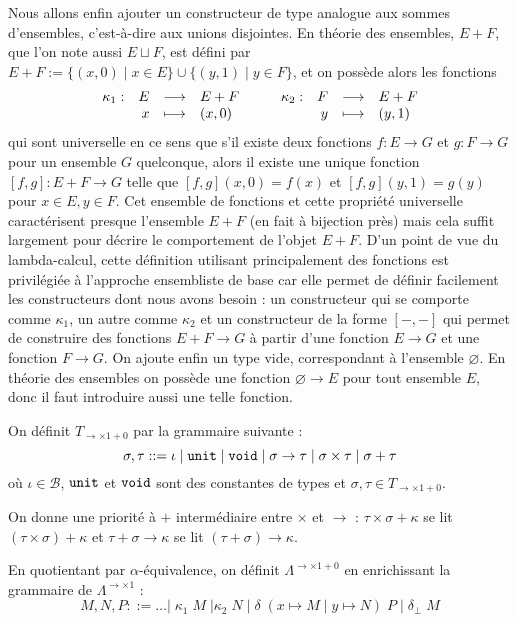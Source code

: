 Nous allons enfin ajouter un constructeur de type analogue aux sommes d'ensembles, c'est-à-dire aux unions disjointes. En théorie des ensembles, $E + F$, que l'on note aussi $E\sqcup F$, est défini par $E + F := \{(x,0)\mid x\in E\}\cup \{(y,1)\mid y\in F\}$, et on possède alors les fonctions $$\begin{array}[t]{lrcl} \kappa_1: & E & \longrightarrow & E+F \\ & x & \longmapsto & (x,0) \end{array}\qquad\begin{array}[t]{lrcl} \kappa_2: & F & \longrightarrow & E+F \\ & y & \longmapsto & (y,1) \end{array}$$ qui sont universelle en ce sens que s'il existe deux fonctions $f : E \to G$ et $g : F\to G$ pour un ensemble $G$ quelconque, alors il existe une unique fonction $[f,g] : E+F\to G$ telle que $[f,g](x,0) = f(x)$ et $[f,g](y,1) = g(y)$ pour $x\in E, y\in F$. Cet ensemble de fonctions et cette propriété universelle caractérisent presque l'ensemble $E+F$ (en fait à bijection près) mais cela suffit largement pour décrire le comportement de l'objet $E+F$. D'un point de vue du lambda-calcul, cette définition utilisant principalement des fonctions est privilégiée à l'approche ensembliste de base car elle permet de définir facilement les constructeurs dont nous avons besoin : un constructeur qui se comporte comme $\kappa_1$, un autre comme $\kappa_2$ et un constructeur de la forme $[-,-]$ qui permet de construire des fonctions $E+F\to G$ à partir d'une fonction $E\to G$ et une fonction $F\to G$. On ajoute enfin un type vide, correspondant à l'ensemble $\varnothing$. En théorie des ensembles on possède une fonction $\varnothing \to E$ pour tout ensemble $E$, donc il faut introduire aussi une telle fonction.

\begin{defi}
    On définit $T_{\to\times 1+0}$ par la grammaire suivante : $$\sigma,\tau ::= \iota\mid\texttt{unit}\mid\texttt{void}\mid \sigma\to\tau\mid\sigma\times\tau\mid\sigma+\tau$$ où $\iota\in\mathcal B$, $\texttt{unit}$ et $\texttt{void}$ sont des constantes de types et $\sigma,\tau\in T_{\to\times 1+0}$.
\end{defi}

\begin{rmk}
    On donne une priorité à $+$ intermédiaire entre $\times$ et $\to$ : $\tau\times\sigma+\kappa$ se lit $(\tau\times\sigma)+\kappa$ et $\tau+\sigma\to\kappa$ se lit $(\tau+\sigma)\to\kappa$.
\end{rmk}

\begin{defi}
    En quotientant par $\alpha$-équivalence, on définit $\Lambda^{\to\times 1+0}$ en enrichissant la grammaire de $\Lambda^{\to\times 1}$ :
    $$M,N,P::=\ldots\Big|\; \kappa_1\;M\;\Big|\kappa_2\;N\;\Big|\;\delta\;(x\mapsto M\mid y\mapsto N)\;P\;\Big|\; \delta_\bot\;M$$
\end{defi}

